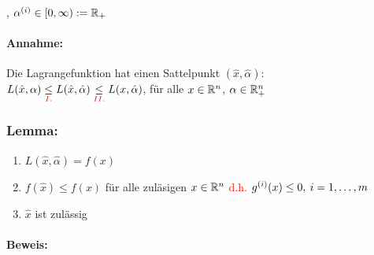 		\begin{center}
			, $ \alpha^{(i)}  \in [0, \infty ) := \mathbb{R}_+$
		\end{center}
		
		\paragraph*{Annahme:} Die Lagrangefunktion hat einen Sattelpunkt $ (\hat{x}, \hat{\alpha}) $:\\
		
		$ L(\hat{x}, \alpha) \underset{\textcolor{red}{I.}}{\leq} L(\hat{x}, \hat{\alpha}) \underset{\textcolor{red}{II.}}{\leq} L(x, \hat{\alpha})$, für alle $ x \in \mathbb{R}^n$, $\alpha \in \mathbb{R}^n_+ $
		
		\subsubsection*{Lemma:}
			\begin{enumerate}[1.]
				\item $ L(\hat{x}, \hat{\alpha})  =  f(x)$
				\item $ f(\hat{x}) \leq f(x)$ für alle zuläsigen $ x \in \mathbb{R}^n $ \textcolor{red}{d.h. $ g^{(i)}(x) \leq 0, \medspace i = 1,\dots,m $}
				\item $ \hat{x} $ ist zulässig
			\end{enumerate}
		
		\paragraph{Beweis:}
			
